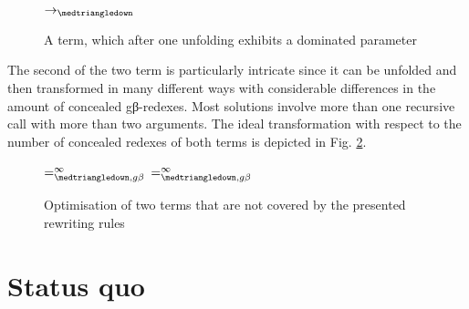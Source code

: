 \documentclass[submission,copyright,creativecommons]{eptcs}
\newcommand{\indap}[2]{#1_{#2}}
\newcommand{\sredi}{\indap{\rightarrow}}
\newcommand{\genbetaredsubscript}{g\hspace*{0pt}\beta}
\newcommand{\unfoldredsubscript}{\medtriangledown}
\newcommand{\sunfoldred}{\sredi{\unfoldredsubscript}}
\newcommand{\unfoldred}{\mathrel{\sunfoldred}}
\newcommand{\sopeq}{=^{\infty}_{\unfoldredsubscript,\genbetaredsubscript}}\newcommand{\opeq}{\mathrel{\sopeq}}
\renewcommand\;{\,}
\begin{document}
\begin{figure}[ht]
\begin{center}
\hspace{1cm}
\hspace{5mm}$\unfoldred$\hspace{5mm}
\hspace{1cm}
\caption{\label{fx-fy}A term, which after one unfolding exhibits a dominated parameter}
\end{center}
\end{figure}

The second of the two term is particularly intricate since it can be unfolded
and then transformed in many different ways with considerable differences in
the amount of concealed gβ-redexes. Most solutions involve more than one
recursive call with more than two arguments. The ideal transformation with respect to
the number of concealed redexes of both terms is depicted in Fig.
\ref{intricate}.

\begin{figure}[ht]
$\sopeq$
\hfill
{}
$\sopeq$
\caption{\label{intricate}Optimisation of two terms that are not covered by the presented rewriting rules}
\end{figure}







\section{Status quo}
\end{document}
